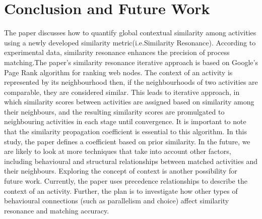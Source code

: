 \documentclass[runningheads]{llncs}
\begin{document}
\section{Conclusion and Future Work}
The paper discusses how to quantify global contextual similarity among activities using a newly developed similarity metric(i.e.Similarity Resonance). According to experimental data, similarity resonance enhances the precision of process matching.The paper's similarity resonance iterative approach is based on Google's Page Rank algorithm for ranking web nodes. The context of an activity is represented by its neighbourhood then, if the neighbourhoods of two activities are comparable, they are considered similar. This leads to iterative approach, in which similarity scores between activities are assigned based on similarity among their neighbours, and the resulting similarity scores are promulgated to neighbouring activities in each stage until convergence. It is important to note that the similarity propagation coefficient is essential to this algorithm. In this study, the paper defines a coefficient based on prior similarity. In the future, we are likely to look at more techniques that take into account other factors, including behavioural and structural relationships between matched activities and their neighbours. Exploring the concept of context is another possibility for future work. Currently, the paper uses precedence relationships to describe the context of an activity. Further, the plan is to investigate how other types of behavioural connections (such as parallelism and choice) affect similarity resonance and matching accuracy.
\end{document}
